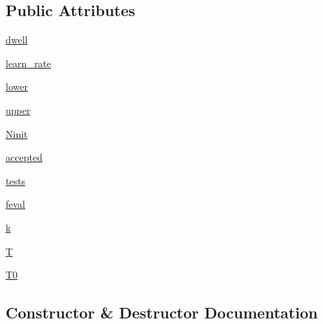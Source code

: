 \subsection*{Public Attributes}
\begin{DoxyCompactItemize}
\item 
\hyperlink{classscipy_1_1optimize_1_1anneal_1_1base__schedule_af42601c6ffd19cd69bce32fa2d0af98a}{dwell}
\item 
\hyperlink{classscipy_1_1optimize_1_1anneal_1_1base__schedule_a1264bde0cca14294bc54d9e1c6080aa5}{learn\+\_\+rate}
\item 
\hyperlink{classscipy_1_1optimize_1_1anneal_1_1base__schedule_a356a5af5913742b313204fcb80394a5f}{lower}
\item 
\hyperlink{classscipy_1_1optimize_1_1anneal_1_1base__schedule_ae7a20d41d80970a6c85b22cc22569071}{upper}
\item 
\hyperlink{classscipy_1_1optimize_1_1anneal_1_1base__schedule_ad90381d2dd2620e4b0c9fb3ede15f3f3}{Ninit}
\item 
\hyperlink{classscipy_1_1optimize_1_1anneal_1_1base__schedule_a6436610d431327f71691344198da23da}{accepted}
\item 
\hyperlink{classscipy_1_1optimize_1_1anneal_1_1base__schedule_a464838842457f4364f9115ae8a965da2}{tests}
\item 
\hyperlink{classscipy_1_1optimize_1_1anneal_1_1base__schedule_af8748ff8e08d0ca876e9ba3fdea37537}{feval}
\item 
\hyperlink{classscipy_1_1optimize_1_1anneal_1_1base__schedule_ac5b4b22f1e7c88692bd8de201855151d}{k}
\item 
\hyperlink{classscipy_1_1optimize_1_1anneal_1_1base__schedule_a6cb263646ab1f2f07e2245d614bcc7d1}{T}
\item 
\hyperlink{classscipy_1_1optimize_1_1anneal_1_1base__schedule_a8f459f611ec06604c5854f5252581ea8}{T0}
\end{DoxyCompactItemize}


\subsection{Constructor \& Destructor Documentation}
\hypertarget{classscipy_1_1optimize_1_1anneal_1_1base__schedule_a0b6a9e3c0ce26bdd70e294689751de5b}{}
